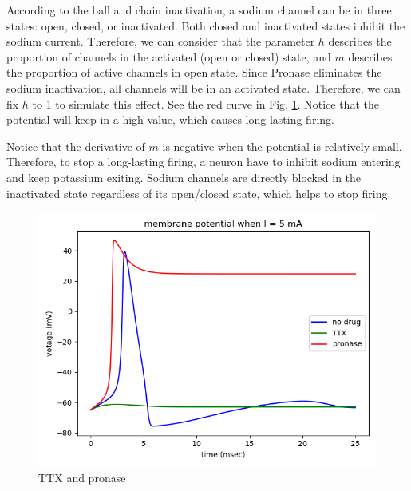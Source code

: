 \documentclass[11pt]{article}
\begin{document}
\begin{enumerate}
\begin{enumerate}
    		According to the ball and chain inactivation, a sodium channel can be in three states: open, closed, or inactivated. Both closed and inactivated states inhibit the sodium current. Therefore, we can consider that the parameter $h$ describes the proportion of channels in the activated (open or closed) state, and $m$ describes the proportion of active channels in open state. Since Pronase eliminates the sodium inactivation, all channels will be in an activated state. Therefore, we can fix $h$ to 1 to simulate this effect. See the red curve in Fig. \ref{fig:fig5}. Notice that the potential will keep in a high value, which causes long-lasting firing.
    		
    		Notice that the derivative of $m$ is negative when the potential is relatively small. Therefore, to stop a long-lasting firing, a neuron have to inhibit sodium entering and keep potassium exiting. Sodium channels are directly blocked in the inactivated state regardless of its open/closed state, which helps to stop firing.
		
		\end{enumerate}
		
		\begin{figure}[ht]
			\centering
			\includegraphics[width=.6\textwidth]{plot_programming_7.png}
			\caption{TTX and pronase}
			\label{fig:fig5}
		\end{figure}
	\end{enumerate}
	
	
    
\end{document}
